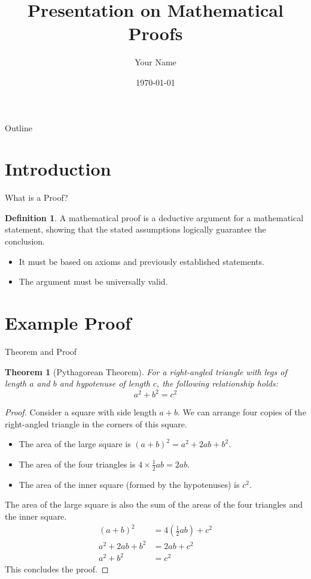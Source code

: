\documentclass{beamer}
\title{Presentation on Mathematical Proofs}
\author{Your Name}
\institute{Your Institution}
\date{\today}
\theoremstyle{plain}
\newtheorem{theorem}{Theorem}
\theoremstyle{definition}
\newtheorem{definition}{Definition}
\theoremstyle{remark}
\begin{document}
\begin{frame}
    \titlepage
\end{frame}

\begin{frame}{Outline}
    \tableofcontents
\end{frame}

\section{Introduction}

\begin{frame}{What is a Proof?}
    \begin{definition}
        A mathematical proof is a deductive argument for a mathematical statement, showing that the stated assumptions logically guarantee the conclusion.
    \end{definition}
    \begin{itemize}
        \item It must be based on axioms and previously established statements.
        \item The argument must be universally valid.
    \end{itemize}
\end{frame}

\section{Example Proof}

\begin{frame}{Theorem and Proof}
    \begin{theorem}[Pythagorean Theorem]
        For a right-angled triangle with legs of length $a$ and $b$ and hypotenuse of length $c$, the following relationship holds:
        \[ a^2 + b^2 = c^2 \]
    \end{theorem}

    \begin{proof}
        Consider a square with side length $a+b$. We can arrange four copies of the right-angled triangle in the corners of this square.
        \begin{itemize}
            \item The area of the large square is $(a+b)^2 = a^2 + 2ab + b^2$.
            \item The area of the four triangles is $4 \times \frac{1}{2}ab = 2ab$.
            \item The area of the inner square (formed by the hypotenuses) is $c^2$.
        \end{itemize}
        The area of the large square is also the sum of the areas of the four triangles and the inner square.
        \begin{align*}
            (a+b)^2 &= 4\left(\frac{1}{2}ab\right) + c^2 \\
            a^2 + 2ab + b^2 &= 2ab + c^2 \\
            a^2 + b^2 &= c^2
        \end{align*}
        This concludes the proof.
    \end{proof}
\end{frame}
\end{document}
